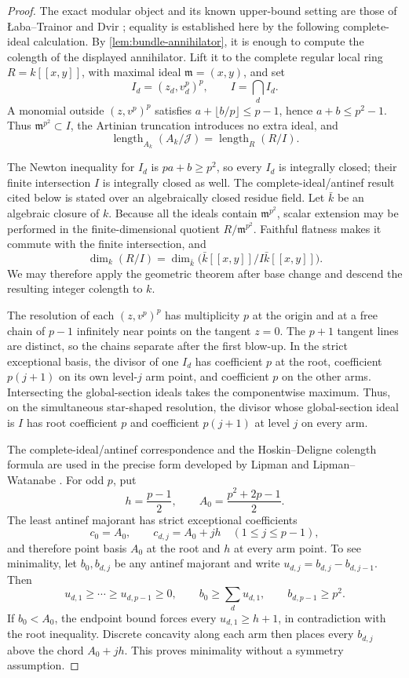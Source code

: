 \documentclass[12pt,a4paper]{article}
\theoremstyle{definition}
\newcommand{\length}{\operatorname{length}}
\begin{document}
\begin{proof}
The exact modular object and its known upper-bound setting are those of
\L aba--Trainor and Dvir \cite{LT25,DVI26}; equality is established here by
the following complete-ideal calculation.  By
\cref{lem:bundle-annihilator}, it is enough to compute the colength of the
displayed annihilator.  Lift it to the complete regular local ring
$R=k[[x,y]]$, with maximal ideal $\mathfrak m=(x,y)$, and set
\[
 I_d=(z_d,v_d^p)^p,\qquad I=\bigcap_d I_d.
\]
A monomial outside $(z,v^p)^p$ satisfies
$a+\lfloor b/p\rfloor\leq p-1$, hence $a+b\leq p^2-1$.
Thus $\mathfrak m^{p^2}\subset I$, the Artinian truncation introduces no extra
ideal, and
\begin{equation}\label{eq:artinian-lift}
 \length_{A_k}(A_k/\mathcal J)=\length_R(R/I).
\end{equation}

The Newton inequality for $I_d$ is $pa+b\geq p^2$, so every $I_d$ is
integrally closed; their finite intersection $I$ is integrally closed as
well.  The complete-ideal/antinef result cited below is stated over an
algebraically closed residue field.  Let $\bar k$ be an algebraic closure of
$k$.  Because all the ideals contain $\mathfrak m^{p^2}$, scalar extension
may be performed in the finite-dimensional quotient $R/\mathfrak m^{p^2}$.
Faithful flatness makes it commute with the finite intersection, and
\[
 \dim_k(R/I)=
 \dim_{\bar k}\bigl(\bar k[[x,y]]/I\bar k[[x,y]]\bigr).
\]
We may therefore apply the geometric theorem after base change and descend
the resulting integer colength to $k$.

The resolution of each $(z,v^p)^p$ has multiplicity $p$ at the
origin and at a free chain of $p-1$ infinitely near points on the tangent
$z=0$.  The $p+1$ tangent lines are distinct, so the chains separate after
the first blow-up.  In the strict exceptional basis, the divisor of one
$I_d$ has coefficient $p$ at the root, coefficient $p(j+1)$ on its own
level-$j$ arm point, and coefficient $p$ on the other arms.  Intersecting
the global-section ideals takes the componentwise maximum.  Thus, on the
simultaneous star-shaped resolution, the divisor whose global-section ideal
is $I$ has root coefficient $p$ and coefficient $p(j+1)$ at level $j$ on
every arm.

The complete-ideal/antinef correspondence and the Hoskin--Deligne colength
formula are used in the precise form developed by Lipman and
Lipman--Watanabe \cite[Section~1]{LIP93}\cite[Corollary~1.1.2 and
Lemma~1.2]{LW03}.  For odd $p$, put
\[
 h=\frac{p-1}{2},\qquad A_0=\frac{p^2+2p-1}{2}.
\]
The least antinef majorant has strict exceptional coefficients
\[
 c_0=A_0,\qquad c_{d,j}=A_0+jh\quad(1\leq j\leq p-1),
\]
and therefore point basis $A_0$ at the root and $h$ at every arm point.
To see minimality, let $b_0,b_{d,j}$ be any antinef majorant and write
$u_{d,j}=b_{d,j}-b_{d,j-1}$.  Then
\[
 u_{d,1}\geq\cdots\geq u_{d,p-1}\geq0,\qquad
 b_0\geq\sum_d u_{d,1},\qquad b_{d,p-1}\geq p^2.
\]
If $b_0<A_0$, the endpoint bound forces every $u_{d,1}\geq h+1$, in
contradiction with the root inequality.  Discrete concavity along each arm
then places every $b_{d,j}$ above the chord $A_0+jh$.  This proves
minimality without a symmetry assumption.


\end{proof}
\end{document}
